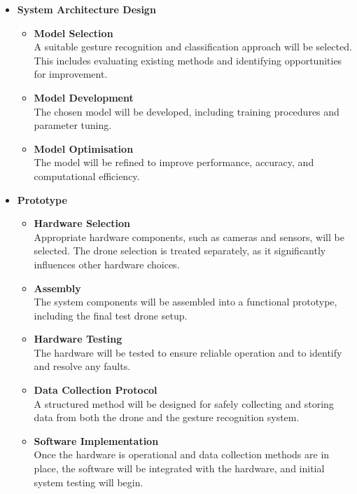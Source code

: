 \begin{itemize}
\item \textbf{System Architecture Design}
\begin{itemize}
    \item \textbf{Model Selection} \\
    A suitable gesture recognition and classification approach will be selected. This includes evaluating existing methods and identifying opportunities for improvement.

    \item \textbf{Model Development} \\
    The chosen model will be developed, including training procedures and parameter tuning.

    \item \textbf{Model Optimisation} \\
    The model will be refined to improve performance, accuracy, and computational efficiency.
\end{itemize}

\item \textbf{Prototype}
\begin{itemize}
    \item \textbf{Hardware Selection} \\
    Appropriate hardware components, such as cameras and sensors, will be selected. The drone selection is treated separately, as it significantly influences other hardware choices.

    \item \textbf{Assembly} \\
    The system components will be assembled into a functional prototype, including the final test drone setup.

    \item \textbf{Hardware Testing} \\
    The hardware will be tested to ensure reliable operation and to identify and resolve any faults.

    \item \textbf{Data Collection Protocol} \\
    A structured method will be designed for safely collecting and storing data from both the drone and the gesture recognition system.

    \item \textbf{Software Implementation} \\
    Once the hardware is operational and data collection methods are in place, the software will be integrated with the hardware, and initial system testing will begin.


\end{itemize}
\end{itemize}

